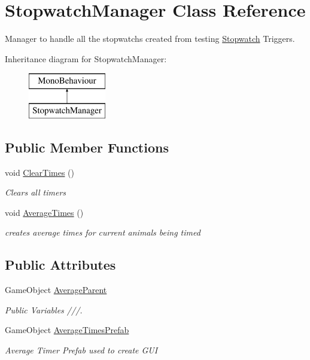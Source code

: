 \hypertarget{class_stopwatch_manager}{}\section{Stopwatch\+Manager Class Reference}
\label{class_stopwatch_manager}


Manager to handle all the stopwatchs created from testing \mbox{\hyperlink{class_stopwatch}{Stopwatch}} Triggers.  


Inheritance diagram for Stopwatch\+Manager\+:\begin{figure}[H]
\begin{center}
\leavevmode
\includegraphics[height=2.000000cm]{class_stopwatch_manager}
\end{center}
\end{figure}
\subsection*{Public Member Functions}
\begin{DoxyCompactItemize}
\item 
void \mbox{\hyperlink{class_stopwatch_manager_acfac0cb9d7a772f03090bb9b67a4a0e0}{Clear\+Times}} ()
\begin{DoxyCompactList}\small\item\em Clears all timers \end{DoxyCompactList}\item 
void \mbox{\hyperlink{class_stopwatch_manager_a685b366b8d26cbb98105ad494c398063}{Average\+Times}} ()
\begin{DoxyCompactList}\small\item\em creates average times for current animals being timed \end{DoxyCompactList}\end{DoxyCompactItemize}
\subsection*{Public Attributes}
\begin{DoxyCompactItemize}
\item 
Game\+Object \mbox{\hyperlink{class_stopwatch_manager_a295face8d1fa1c320c6ecb56dcdf34bf}{Average\+Parent}}
\begin{DoxyCompactList}\small\item\em Public Variables ///. \end{DoxyCompactList}\item 
Game\+Object \mbox{\hyperlink{class_stopwatch_manager_aee1fa79b0c39d55909b198dfab997bd0}{Average\+Times\+Prefab}}
\begin{DoxyCompactList}\small\item\em Average Timer Prefab used to create G\+UI \end{DoxyCompactList}\end{DoxyCompactItemize}


